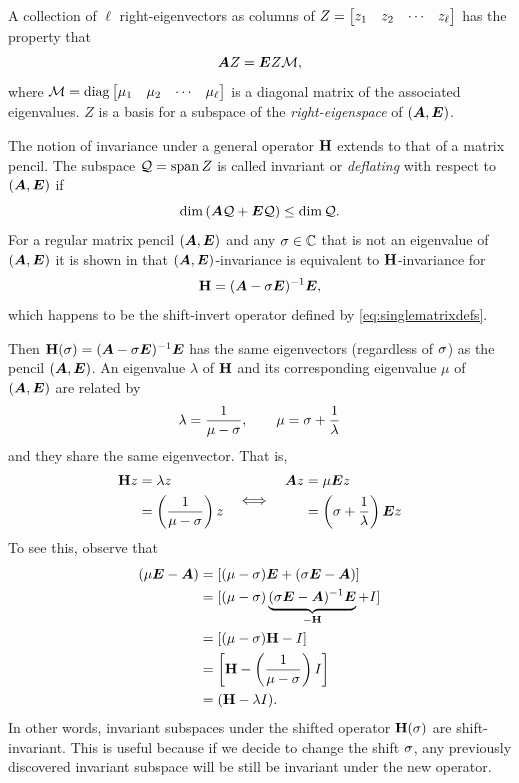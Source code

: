 A collection of $\ell$ right-eigenvectors as columns of $Z =\begin{bmatrix} z_1&z_2&\cdots&z_\ell\end{bmatrix}$  has the property that
\begin{equation}
\bm{A} Z= \bm{E} Z \mathcal{M},
\label{eq:right_eigen}
\end{equation}
 where $\mathcal{M} = \text{diag}\begin{bmatrix} \mu_1 & \mu_2 &\cdots&\mu_\ell\end{bmatrix}$ is a diagonal matrix of the associated eigenvalues.  $Z$ is a basis for a subspace of the \emph{right-eigenspace} of $(\bm{A},\bm{E})$.

\bigskip
The notion of invariance under a general operator $\textbf{\textup{H}}$ extends to that of a matrix pencil. The subspace $\mathcal{Q} = \operatorname*{span} Z$ is  called invariant or \emph{deflating} \cite{stewart1972sensitivity} with respect to $(\bm{A},\bm{E})$ if
\begin{equation}
\dim \left(\bm{A} \mathcal{Q} + \bm{E} \mathcal{Q}  \right) \leq \dim \mathcal{Q}.
\label{eq:generalized_invariance1}
\end{equation}
 For a regular matrix pencil $(\bm{A},\bm{E})$ and any $\sigma\in\mathbb{C}$ that is not an eigenvalue of $(\bm{A},\bm{E})$ it is shown in \cite{gracia1995stability} that $(\bm{A},\bm{E})$-invariance is equivalent to $\textbf{\textup{H}}$-invariance for 
\begin{equation}
\textbf{\textup{H}} = (\bm{A}-\sigma \bm{E})^{-1} \bm{E}, 
\label{eq:AE}
\end{equation}
which happens to be the shift-invert operator defined by \eqref{eq:singlematrixdefs}.   

\smallskip
Then $\textbf{\textup{H}}(\sigma)=(\bm{A}-\sigma \bm{E})^{-1} \bm{E}$ has the same eigenvectors (regardless of $\sigma$) as the pencil $(\bm{A},\bm{E})$.   An eigenvalue $\lambda$ of $\textbf{\textup{H}}$ and its corresponding eigenvalue $\mu$ of $(\bm{A},\bm{E})$ are related by   
\begin{equation}
      \lambda = \frac{1}{\mu-\sigma}, \qquad \mu = \sigma + \frac{1}{\lambda}
	\label{eq:pole_eig}
\end{equation}
and they share the same eigenvector. That is, 
\[
\begin{aligned}
\textbf{\textup{H}} z &= \lambda z \\
&= \left( \frac{1}{\mu-\sigma} \right) z
\end{aligned}
 \quad \Longleftrightarrow \quad 
\begin{aligned}
\bm{A} z &= \mu \bm{E} z \\
&= \left(\sigma + \frac{1}{\lambda}\right)\bm{E} z
\end{aligned} 	
\]
To see this, observe that 
\begin{equation}
\begin{aligned}
(\mu \bm{E} - \bm{A}) &= \left[ (\mu-\sigma)\bm{E} + (\sigma \bm{E}-\bm{A})                     \right]  \\
&= [ (\mu-\sigma)\underbrace{(\sigma \bm{E}-\bm{A})^{-1}\bm{E}}_{-\textbf{\textup{H}}} + I ]  \\
&= \left[ (\mu-\sigma)\textbf{\textup{H}} - I                                \right]  \\
&= \left[ \textbf{\textup{H}}-\left(\frac{1}{\mu-\sigma}\right)I             \right]  \\
&= ( \textbf{\textup{H}}-\lambda I  ) .
\end{aligned}
\label{eq:shift_invariance}
\end{equation}
In other words, invariant subspaces under the shifted operator $\textbf{\textup{H}}(\sigma)$ are shift-invariant.  This is useful because if we decide to change the shift $\sigma$, any previously discovered invariant subspace will be still be invariant under the new operator.

